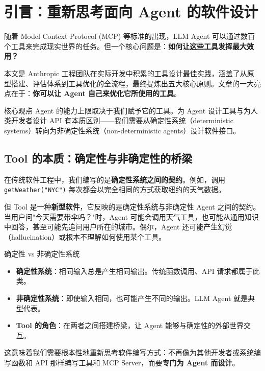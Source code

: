 \documentclass[a4paper]{article}
\begin{document}
\section{引言：重新思考面向 Agent 的软件设计}

随着 Model Context Protocol (MCP) 等标准的出现，LLM Agent 可以通过数百个工具来完成现实世界的任务。但一个核心问题是：\textbf{如何让这些工具发挥最大效用？}

本文是 Anthropic 工程团队在实际开发中积累的工具设计最佳实践，涵盖了从原型搭建、评估体系到工具优化的全流程，最终提炼出五大核心原则。文章的一大亮点在于：\textbf{你可以让 Agent 自己来优化它所使用的工具}。

\begin{importantbox}{核心观点}
Agent 的能力上限取决于我们赋予它的工具。为 Agent 设计工具与为人类开发者设计 API 有本质区别——我们需要从确定性系统（deterministic systems）转向为非确定性系统（non-deterministic agents）设计软件接口。
\end{importantbox}

\subsection{Tool 的本质：确定性与非确定性的桥梁}

在传统软件工程中，我们编写的是\textbf{确定性系统之间的契约}。例如，调用 \texttt{getWeather("NYC")} 每次都会以完全相同的方式获取纽约的天气数据。

但 Tool 是一种\textbf{新型软件}，它反映的是确定性系统与非确定性 Agent 之间的契约。当用户问"今天需要带伞吗？"时，Agent 可能会调用天气工具，也可能从通用知识中回答，甚至可能先追问用户所在的城市。偶尔，Agent 还可能产生幻觉（hallucination）或根本不理解如何使用某个工具。

\begin{knowledgebox}{确定性 vs 非确定性系统}
\begin{itemize}[leftmargin=1.5em]
    \item \textbf{确定性系统}：相同输入总是产生相同输出。传统函数调用、API 请求都属于此类。
    \item \textbf{非确定性系统}：即使输入相同，也可能产生不同的输出。LLM Agent 就是典型代表。
    \item \textbf{Tool 的角色}：在两者之间搭建桥梁，让 Agent 能够与确定性的外部世界交互。
\end{itemize}
\end{knowledgebox}

这意味着我们需要根本性地重新思考软件编写方式：不再像为其他开发者或系统编写函数和 API 那样编写工具和 MCP Server，而要\textbf{专门为 Agent 而设计}。
\end{document}
